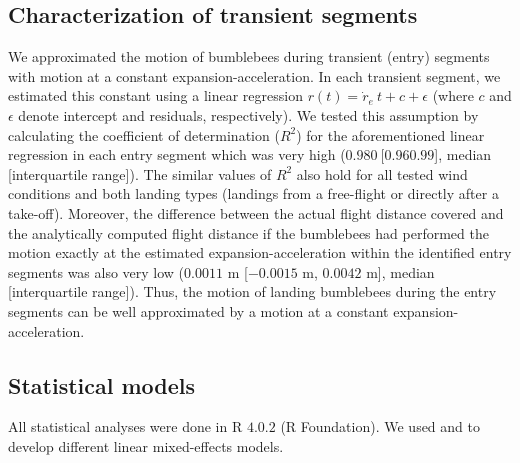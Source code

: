 \subsection{Characterization of transient segments}
\label{ssec:rdot_approx}
We approximated the motion of bumblebees during transient (entry) segments with motion at a constant expansion-acceleration. In each transient segment, we estimated this constant using a linear regression $r(t) = \dot{r}_e~t + c + \epsilon$ (where $c$ and $\epsilon$ denote intercept and residuals, respectively). We tested this assumption by calculating the coefficient of determination ($R^2$) for the aforementioned linear regression in each entry segment which was very high ($0.980~ [0.96 0.99$], median [interquartile range]). The similar values of $R^2$ also hold for all tested wind conditions and both landing types (landings from a free-flight or directly after a take-off). Moreover, the difference between the actual flight distance covered and the analytically computed flight distance if the bumblebees had performed the motion exactly at the estimated expansion-acceleration within the identified entry segments was also very low ($0.0011$ m [$-0.0015$ m, $0.0042$ m], median [interquartile range]). Thus, the motion of landing bumblebees during the entry segments can be well approximated by a motion at a constant expansion-acceleration. 

\subsection{Statistical models}
\label{ssec:stat_models}
All statistical analyses were done in R $4.0.2$ (R Foundation). We used  and  to develop different linear mixed-effects models.

